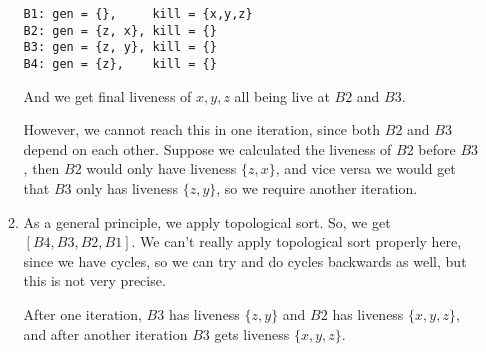 \begin{enumerate}[label=(\alph*)]
\begin{enumerate}[label=(\roman*)]
\begin{verbatim}
B1: gen = {},     kill = {x,y,z}
B2: gen = {z, x}, kill = {}
B3: gen = {z, y}, kill = {}
B4: gen = {z},    kill = {}
\end{verbatim}

And we get final liveness of $x,y,z$ all being live at $B2$ and $B3$.

However, we cannot reach this in one iteration, since both $B2$ and $B3$ depend on each other. Suppose we calculated the liveness of $B2$ before $B3$, then $B2$ would only have liveness $\{z,x\}$, and vice versa we would get that $B3$ only has liveness $\{z,y\}$, so we require another iteration.

\item
  As a general principle, we apply topological sort. So, we get $[B4, B3, B2, B1]$. We can't really apply topological sort properly here, since we have cycles, so we can try and do cycles backwards as well, but this is not very precise.

  After one iteration, $B3$ has liveness $\{z,y\}$ and $B2$ has liveness $\{x,y,z\}$, and after another iteration $B3$ gets liveness $\{x,y,z\}$.
    
\end{enumerate}





        
\end{enumerate}

